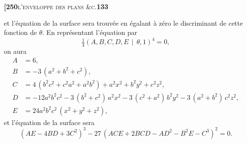\documentclass[11pt]{article}
\newcommand{\Cdel}{\mid}
\begin{document}
\newpage

\noindent\textbf{[250}\hfill\textsc{l'enveloppe des plans \&c.}\hfill\textbf{133}

\medskip

\noindent et l'équation de la surface sera trouvée en égalant à zéro le discriminant de cette fonction de $\theta$. En représentant l'équation par
\[
\tfrac{1}{4}(A,B,C,D,E\,\Cdel\,\theta,1)^4 = 0,
\]
on aura
\begin{align*}
A &= 6,\\
B &= -3\,(a^2 + b^2 + c^2),\\
C &= 4\,(b^2c^2 + c^2a^2 + a^2b^2) + a^2x^2 + b^2y^2 + c^2z^2,\\
D &= -12a^2b^2c^2 - 3\,(b^2 + c^2)\,a^2x^2 - 3\,(c^2 + a^2)\,b^2y^2 - 3\,(a^2 + b^2)\,c^2z^2,\\
E &= 24a^2b^2c^2\,(x^2 + y^2 + z^2),
\end{align*}
et l'équation de la surface sera
\[
(AE - 4BD + 3C^2)^3 - 27\,(ACE + 2BCD - AD^2 - B^2E - C^3)^2 = 0.
\]
\end{document}
